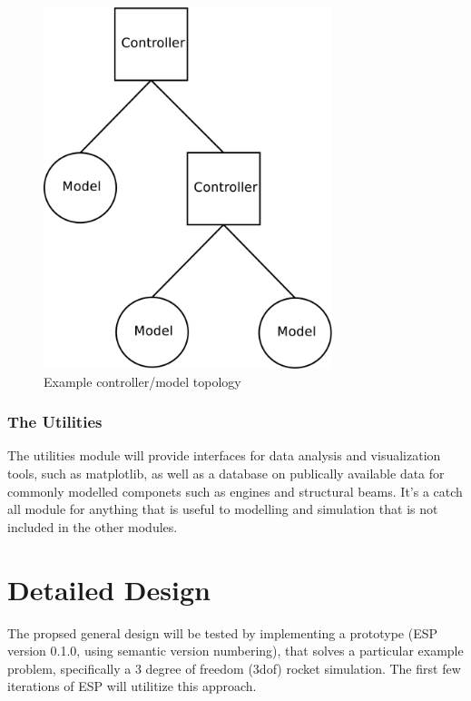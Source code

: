 \documentclass{book}
\begin{document}
\begin{figure}
\centering
\leavevmode
\includegraphics[width=0.75\textwidth]{example_controller_layout.pdf}
\caption{Example controller/model topology}
\label{example_controller_model_topology}
\end{figure}

\subsection{The Utilities}
The utilities module will provide interfaces for data analysis and visualization tools, such as matplotlib, as well as a database on publically available data for commonly modelled componets such as engines and structural beams. It's a catch all module for anything that is useful to modelling and simulation that is not included in the other modules.


\chapter{Detailed Design}
The propsed general design will be tested by implementing a prototype (ESP version 0.1.0, using semantic version numbering), that solves a particular example problem, specifically a 3 degree of freedom (3dof) rocket simulation. The first few iterations of ESP will utilitize this approach.
\end{document}
